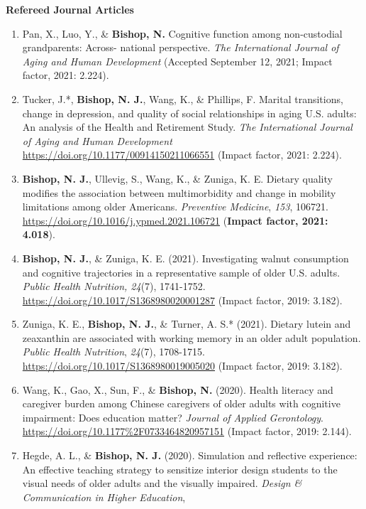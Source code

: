 \documentclass[
]{article}
\begin{document}
\textbf{Refereed Journal Articles}

\begin{enumerate}
\def\labelenumi{\arabic{enumi}.}
\item
  Pan, X., Luo, Y., \& \textbf{Bishop, N.} Cognitive function among
  non-custodial grandparents: Across- national perspective. \emph{The
  International Journal of Aging and Human Development} (Accepted
  September 12, 2021; Impact factor, 2021: 2.224).
\item
  Tucker, J.*, \textbf{Bishop, N. J.}, Wang, K., \& Phillips, F. Marital
  transitions, change in depression, and quality of social relationships
  in aging U.S. adults: An analysis of the Health and Retirement Study.
  \emph{The International Journal of Aging and Human Development}
  \url{https://doi.org/10.1177/00914150211066551} (Impact factor, 2021:
  2.224).
\item
  \textbf{Bishop, N. J.}, Ullevig, S., Wang, K., \& Zuniga, K. E.
  Dietary quality modifies the association between multimorbidity and
  change in mobility limitations among older Americans. \emph{Preventive
  Medicine}, \emph{153}, 106721.
  \url{https://doi.org/10.1016/j.ypmed.2021.106721} (\textbf{Impact
  factor, 2021: 4.018}).
\item
  \textbf{Bishop, N. J.}, \& Zuniga, K. E. (2021). Investigating walnut
  consumption and cognitive trajectories in a representative sample of
  older U.S. adults. \emph{Public Health Nutrition, 24}(7), 1741-1752.
  \url{https://doi.org/10.1017/S1368980020001287} (Impact factor, 2019:
  3.182).
\item
  Zuniga, K. E., \textbf{Bishop, N. J.}, \& Turner, A. S.* (2021).
  Dietary lutein and zeaxanthin are associated with working memory in an
  older adult population. \emph{Public Health Nutrition}, \emph{24}(7),
  1708-1715. \url{https://doi.org/10.1017/S1368980019005020} (Impact
  factor, 2019: 3.182).
\item
  Wang, K., Gao, X., Sun, F., \& \textbf{Bishop, N.} (2020). Health
  literacy and caregiver burden among Chinese caregivers of older adults
  with cognitive impairment: Does education matter? \emph{Journal of
  Applied Gerontology}.
  \url{https://doi.org/10.1177\%2F0733464820957151} (Impact factor,
  2019: 2.144).
\item
  Hegde, A. L., \& \textbf{Bishop, N. J.} (2020). Simulation and
  reflective experience: An effective teaching strategy to sensitize
  interior design students to the visual needs of older adults and the
  visually impaired. \emph{Design \& Communication in Higher Education},

\end{enumerate}
\end{document}
